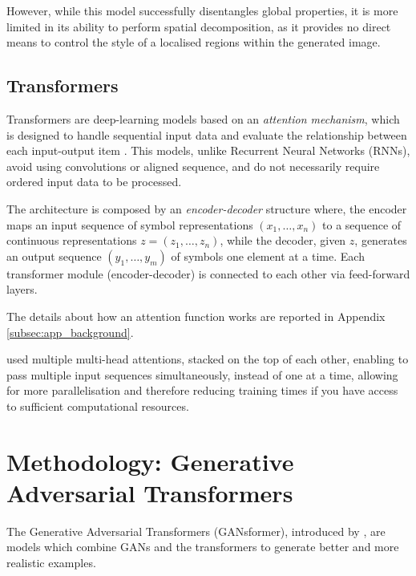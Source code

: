 \documentclass{article}
\begin{document}
	However, while this model successfully disentangles global properties, it is more limited in its ability 
	to perform spatial decomposition, as it provides no direct means to control the style of a localised 
	regions within the generated image.

	\subsection{Transformers}\label{sec:transformer}
	Transformers are deep-learning models based on an \textit{attention mechanism}, which is 
	designed 
	to handle sequential input data and evaluate the relationship between each input-output item 
	\cite{vaswani2017attention}.
	This models, unlike Recurrent Neural Networks (RNNs), avoid using convolutions or aligned 
	sequence, and do not necessarily require ordered input data to be processed. 
	
	The architecture is composed by an \textit{encoder-decoder} structure where, the {encoder} 
	maps 
	an input sequence of symbol representations $(x_1,\dots, x_n)$ to a sequence of continuous 
	representations $z = (z_1, \dots, z_n)$, while the  {decoder}, given $z$, generates an output 
	sequence $(y_1, \dots, y_m)$ of symbols one element at a time. 
	Each transformer module (encoder-decoder) is connected to each other via feed-forward 
	layers.
	
	The details about how an attention function works are reported in Appendix 
	\ref{subsec:app_background}. 

	\citet{vaswani2017attention} used multiple multi-head attentions, stacked on the top of each 
	other, 
	enabling to pass multiple input sequences simultaneously, instead of one at a time, allowing 
	for 
	more parallelisation and therefore reducing training times if you have access to sufficient 
	computational resources.

	\section{Methodology: Generative Adversarial Transformers}\label{sec:ganformer}
	
	The Generative Adversarial Transformers (GANsformer), introduced by 
	\citet{hudson2021generative}, are models which combine GANs and the transformers to 
	generate 
	better and more realistic examples.
	
\end{document}
